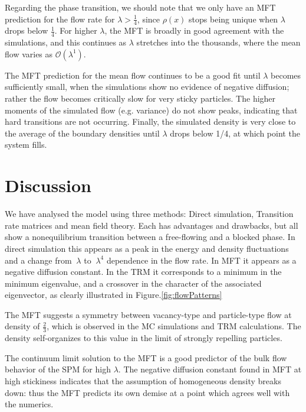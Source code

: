 \documentclass[
reprint, amsmath,amssymb, aps,
 pre, longbibliography,
]{revtex4-1}
\begin{document}
Regarding the phase transition, we should note that we only have an
MFT prediction for the flow rate for $\lambda>\frac{1}{4}$, since
$\rho(x)$ stops being unique when $\lambda$ drops below $\frac{1}{4}$. For higher $\lambda$, the MFT is broadly in good agreement with the
simulations, and this continues as $\lambda$ stretches into the
thousands, where the mean flow varies as $\mathcal{O}(\lambda^1)$.


The MFT prediction for the mean flow continues to be a good fit until $\lambda$ becomes sufficiently small,
when the simulations show no evidence of negative diffusion; rather the flow becomes critically slow for very sticky particles.
The higher moments of the simulated flow (e.g. variance) do not show peaks, indicating that hard transitions are not occurring.
Finally, the  simulated density is very close to the average of the boundary densities until $\lambda$ drops below 1/4, at which point the system fills.



\section{Discussion}

We have analysed the model using three methods: Direct simulation,
Transition rate matrices and mean field theory. Each has advantages
and drawbacks, but all show a nonequilibrium transition between a
free-flowing and a blocked phase.  In direct simulation this appears
as a peak in the energy and density fluctuations and a change from
$~\lambda$ to $~\lambda^4$ dependence in the flow rate.  In MFT it
appears as a negative diffusion constant.  In the TRM it corresponds
to a minimum in the minimum eigenvalue, and a crossover in the
character of the associated eigenvector, as clearly illustrated in
Figure.\ref{fig:flowPatterns}

The MFT suggests a symmetry between vacancy-type and particle-type
flow at density of $\frac{2}{3}$, which is observed in the MC
simulations and TRM calculations.  The density self-organizes to this
value in the limit of strongly repelling particles.

The continuum limit solution to
the MFT is a good predictor of the bulk flow behavior of the SPM for
high $\lambda$.  The negative diffusion constant found in MFT at high
stickiness indicates that the assumption of homogeneous density breaks
down: thus the MFT predicts its own demise at a point which agrees well with
the numerics.
\end{document}

